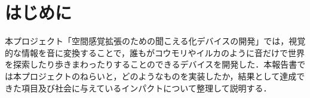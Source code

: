 \section{はじめに}

本プロジェクト「空間感覚拡張のための聞こえる化デバイスの開発」では，視覚的な情報を音に変換することで，誰もがコウモリやイルカのように音だけで世界を探索したり歩きまわったりすることのできるデバイスを開発した．本報告書では本プロジェクトのねらいと，どのようなものを実装したか，結果として達成できた項目及び社会に与えているインパクトについて整理して説明する．
